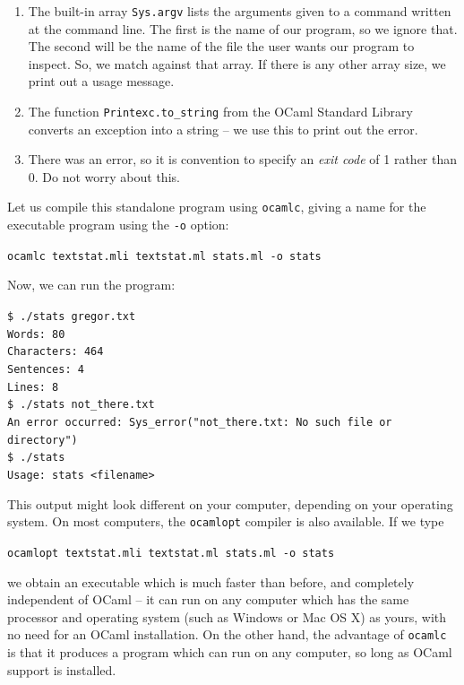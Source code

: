 \documentclass[]{book}
\newcommand{\smspace}{\vspace{4mm}}
\begin{document}
\begin{enumerate}
  \item The built-in array \texttt{Sys.argv} lists the arguments given to a command written at the command line. The first is the name of our program, so we ignore that. The second will be the name of the file the user wants our program to inspect. So, we match against that array. If there is any other array size, we print out a usage message.
  \item The function \texttt{Printexc.to\_string} from the OCaml Standard Library converts an exception into a string -- we use this to print out the error.
  \item There was an error, so it is convention to specify an \textit{exit code} of 1 rather than 0. Do not worry about this.
\end{enumerate}

\noindent Let us compile this standalone program using \texttt{ocamlc}, giving a name for the executable program using the \texttt{-o} option:

\smspace
{}\texttt{ocamlc textstat.mli textstat.ml stats.ml -o stats}
\smspace

\noindent Now, we can run the program:

\smspace
\noindent\texttt{\$ ./stats gregor.txt}\\
\noindent\texttt{Words:\ 80}\\
\noindent\texttt{Characters:\ 464}\\
\noindent\texttt{Sentences:\ 4}\\
\noindent\texttt{Lines:\ 8}\\

\noindent\texttt{\$ ./stats not\_there.txt}\\
\noindent\texttt{An error occurred:\ Sys\_error("not\_there.txt: No such file or directory")}\\

\noindent\texttt{\$ ./stats}\\
\noindent\texttt{Usage:\ stats <filename>}\vphantom{g}
\smspace

\noindent This output might look different on your computer, depending on your operating system. On most computers, the \texttt{ocamlopt} compiler is also available. If we type

\smspace
\texttt{ocamlopt textstat.mli textstat.ml stats.ml -o stats}
\smspace

\noindent we obtain an executable which is much faster than before, and completely independent of OCaml -- it can run on any computer which has the same processor and operating system (such as Windows or Mac OS X) as yours, with no need for an OCaml installation. On the other hand, the advantage of \texttt{ocamlc} is that it produces a program which can run on any computer, so long as OCaml support is installed.
\end{document}

